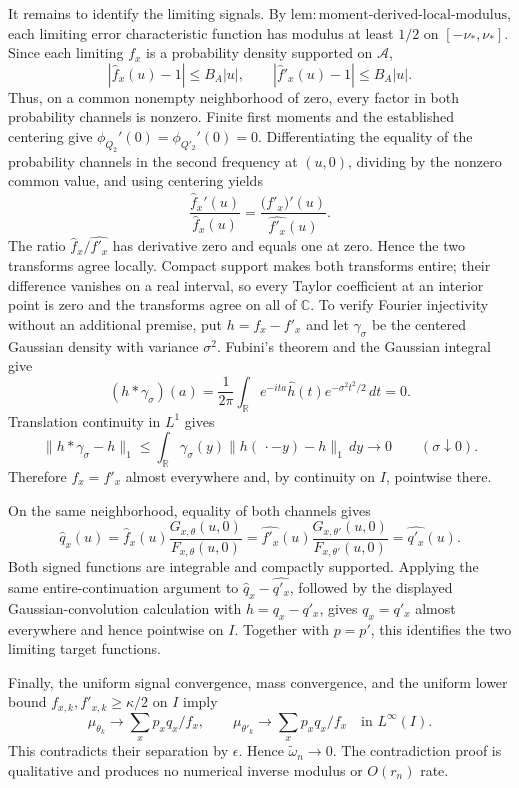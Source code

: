 It remains to identify the limiting signals. By \(\mathrm{lem{:}moment\text{-}derived\text{-}local\text{-}modulus}\), each limiting error characteristic function has modulus at least \(1/2\) on \([-\nu_*,\nu_*]\). Since each limiting \(f_x\) is a probability density supported on \(\mathcal A\),
\[
 |\widehat f_x(u)-1|\le B_A|u|,
 \qquad
 |\widehat f'_x(u)-1|\le B_A|u|.
\]
Thus, on a common nonempty neighborhood of zero, every factor in both probability channels is nonzero. Finite first moments and the established centering give \(\phi_{Q_2}'(0)=\phi_{Q'_2}'(0)=0\). Differentiating the equality of the probability channels in the second frequency at \((u,0)\), dividing by the nonzero common value, and using centering yields
\[
 \frac{\widehat f_x'(u)}{\widehat f_x(u)}
 =\frac{\bigl(\widehat{f'_x}\bigr)'(u)}{\widehat{f'_x}(u)}.
\]
The ratio \(\widehat f_x/\widehat{f'_x}\) has derivative zero and equals one at zero. Hence the two transforms agree locally. Compact support makes both transforms entire; their difference vanishes on a real interval, so every Taylor coefficient at an interior point is zero and the transforms agree on all of \(\mathbb C\). To verify Fourier injectivity without an additional premise, put \(h=f_x-f'_x\) and let \(\gamma_\sigma\) be the centered Gaussian density with variance \(\sigma^2\). Fubini's theorem and the Gaussian integral give
\[
 (h*\gamma_\sigma)(a)=\frac1{2\pi}\int_{\mathbb R}
 e^{-ita}\widehat h(t)e^{-\sigma^2t^2/2}\,dt=0.
\]
Translation continuity in \(L^1\) gives
\[
 \|h*\gamma_\sigma-h\|_1
 \le\int_{\mathbb R}\gamma_\sigma(y)
       \|h(\,\cdot-y)-h\|_1\,dy\longrightarrow0
 \qquad(\sigma\downarrow0).
\]
Therefore \(f_x=f'_x\) almost everywhere and, by continuity on \(I\), pointwise there.

On the same neighborhood, equality of both channels gives
\[
 \widehat q_x(u)
 =\widehat f_x(u)\frac{G_{x,\theta}(u,0)}{F_{x,\theta}(u,0)}
 =\widehat{f'_x}(u)\frac{G_{x,\theta'}(u,0)}{F_{x,\theta'}(u,0)}
 =\widehat{q'_x}(u).
\]
Both signed functions are integrable and compactly supported. Applying the same entire-continuation argument to \(\widehat q_x-\widehat{q'_x}\), followed by the displayed Gaussian-convolution calculation with \(h=q_x-q'_x\), gives \(q_x=q'_x\) almost everywhere and hence pointwise on \(I\). Together with \(p=p'\), this identifies the two limiting target functions.

Finally, the uniform signal convergence, mass convergence, and the uniform lower bound \(f_{x,k},f'_{x,k}\ge\kappa/2\) on \(I\) imply
\[
 \mu_{\theta_k}\to\sum_xp_xq_x/f_x,
 \qquad
 \mu_{\theta'_k}\to\sum_xp_xq_x/f_x
 \quad\text{in }L^\infty(I).
\]
This contradicts their separation by \(\epsilon\). Hence \(\widetilde\omega_n\to0\). The contradiction proof is qualitative and produces no numerical inverse modulus or \(O(r_n)\) rate.

